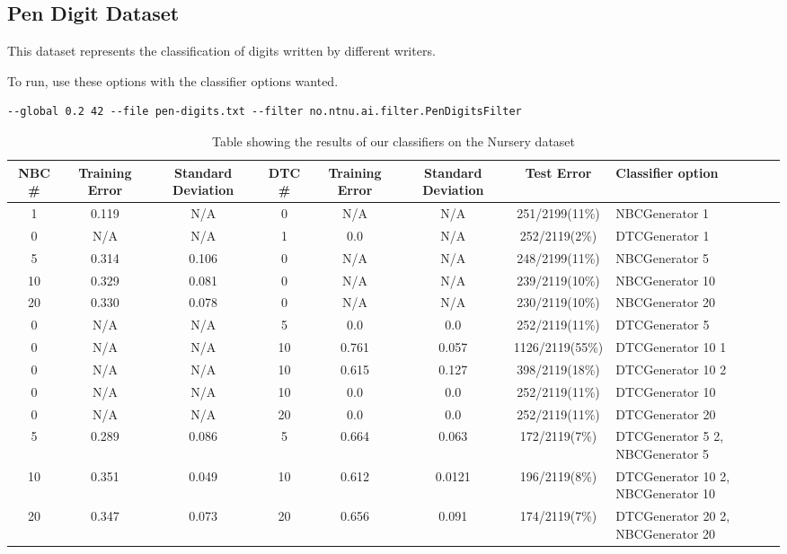 \subsection{Pen Digit Dataset}\label{pen digit dataset}
This dataset represents the classification of digits written by different writers.

To run, use these options with the classifier options wanted.

\begin{lstlisting}[label=lst:pen, caption=Pen digit dataset general options]
--global 0.2 42 --file pen-digits.txt --filter no.ntnu.ai.filter.PenDigitsFilter
\end{lstlisting}

\begin{landscape}
\begin{table}
\begin{tabular}{|c|c|c||c|c|c||c||p{5cm}|}
\hline
NBC \# & Training Error & Standard Deviation & DTC \# & Training Error
& Standard Deviation & Test Error & Classifier option \\ \hline
1 & 0.119 & N/A & 0 & N/A & N/A & 251/2199(11\%) & NBCGenerator 1 \\ \hline
0 & N/A & N/A & 1 & 0.0 & N/A & 252/2119(2\%) & DTCGenerator 1 \\ \hline
5 & 0.314 & 0.106 & 0 & N/A & N/A & 248/2199(11\%) & NBCGenerator 5 \\ \hline
10 & 0.329 & 0.081 & 0 & N/A & N/A & 239/2119(10\%) & NBCGenerator 10 \\ \hline
20 & 0.330 & 0.078 & 0 & N/A & N/A & 230/2119(10\%) & NBCGenerator 20 \\ \hline
0 & N/A & N/A & 5 & 0.0 & 0.0 & 252/2119(11\%) & DTCGenerator 5 \\ \hline
0 & N/A & N/A & 10 & 0.761 & 0.057 & 1126/2119(55\%) & DTCGenerator 10 1 \\ \hline
0 & N/A & N/A & 10 & 0.615 & 0.127 & 398/2119(18\%) & DTCGenerator 10 2 \\ \hline
0 & N/A & N/A & 10 & 0.0 & 0.0 & 252/2119(11\%) & DTCGenerator 10 \\ \hline
0 & N/A & N/A & 20 & 0.0 & 0.0 & 252/2119(11\%)& DTCGenerator 20 \\ \hline
5 & 0.289 & 0.086 & 5 & 0.664 & 0.063 & 172/2119(7\%) & DTCGenerator 5 2, 
\newline NBCGenerator 5 \\ \hline
10 & 0.351 & 0.049 & 10 & 0.612 & 0.0121 & 196/2119(8\%) & DTCGenerator 10 2, 
\newline NBCGenerator 10 \\ \hline
20 & 0.347 & 0.073 & 20 & 0.656 & 0.091 & 174/2119(7\%) & DTCGenerator 20 2, 
\newline NBCGenerator 20 \\ \hline
\hline
\end{tabular}
\label{tab:nursery}
\caption{Table showing the results of our classifiers on the Nursery dataset}
\end{table}
\end{landscape}
